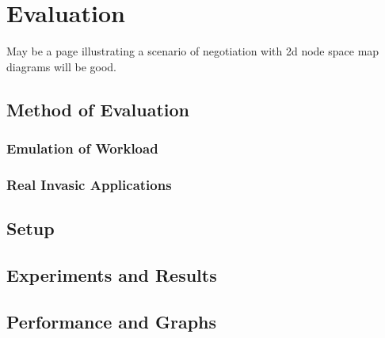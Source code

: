 \chapter{Evaluation}\label{chapter:evaluation}
May be a page illustrating a scenario of negotiation with 2d node space map diagrams will be good.
\section{Method of Evaluation}
\subsection{Emulation of Workload}
\subsection{Real Invasic Applications}
\section{Setup}
\section{Experiments and Results}
\section{Performance and Graphs}
